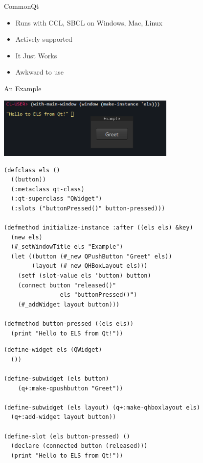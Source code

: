 \documentclass{beamer}
\newcommand{\toptitle}[1]{
  {\Huge #1} \\
  \vspace{0.2cm}
}
\begin{document}
\begin{frame}
  \toptitle{CommonQt}
  \begin{itemize}
  \item Runs with CCL, SBCL on Windows, Mac, Linux
  \item Actively supported
  \item It Just Works\texttrademark
    \pause
  \item Awkward to use
  \end{itemize}
\end{frame}

\begin{frame}
  \toptitle{An Example}
  \begin{center}
    \includegraphics[height=3cm]{example.png}
  \end{center}
\end{frame}

\begin{frame}[fragile]
\begin{verbatim}
(defclass els () 
  ((button))
  (:metaclass qt-class)
  (:qt-superclass "QWidget")
  (:slots ("buttonPressed()" button-pressed)))

(defmethod initialize-instance :after ((els els) &key)
  (new els)
  (#_setWindowTitle els "Example")
  (let ((button (#_new QPushButton "Greet" els))
        (layout (#_new QHBoxLayout els)))
    (setf (slot-value els 'button) button)
    (connect button "released()" 
                els "buttonPressed()")
    (#_addWidget layout button)))

(defmethod button-pressed ((els els))
  (print "Hello to ELS from Qt!"))
\end{verbatim}
\end{frame}

\begin{frame}[fragile]
\begin{verbatim}
(define-widget els (QWidget)
  ())

(define-subwidget (els button) 
    (q+:make-qpushbutton "Greet"))

(define-subwidget (els layout) (q+:make-qhboxlayout els)
  (q+:add-widget layout button))

(define-slot (els button-pressed) ()
  (declare (connected button (released)))
  (print "Hello to ELS from Qt!"))
\end{verbatim}
\end{frame}
\end{document}
